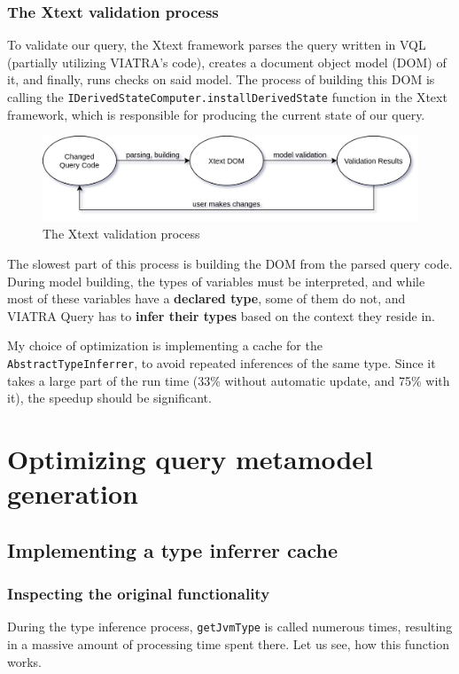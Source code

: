 \documentclass[11pt,a4paper,oneside]{report}
\begin{document}
\subsection{The Xtext validation process}

To validate our query, the Xtext framework parses the query written in VQL
(partially utilizing VIATRA's code), creates a document object model (DOM) of
it, and finally, runs checks on said model. The process of building this DOM is
calling the \texttt{IDerivedStateComputer.installDerivedState} function in the
Xtext framework, which is responsible for producing the current state of our
query.

\begin{figure}[ht]
\centering
\includegraphics[width=150mm, keepaspectratio]{figures/xtext-validation-process.png}
\caption{The Xtext validation process}
\label{fig:xtext-validation-process}
\end{figure}

The slowest part of this process is building the DOM from the parsed query code.
During model building, the types of variables must be interpreted, and while
most of these variables have a \textbf{declared type}, some of them do not, and
VIATRA Query has to \textbf{infer their types} based on the context they reside
in.


My choice of optimization is implementing a cache for the
\texttt{AbstractTypeInferrer}, to avoid repeated inferences of the same type.
Since it takes a large part of the run time (33\% without automatic update,
and 75\% with it), the speedup should be significant.

\chapter{Optimizing query metamodel generation}
\section{Implementing a type inferrer cache}
\subsection{Inspecting the original functionality}
During the type inference process, \texttt{getJvmType} is called numerous times,
resulting in a massive amount of processing time spent there. Let us see, how
this function works.
\end{document}

